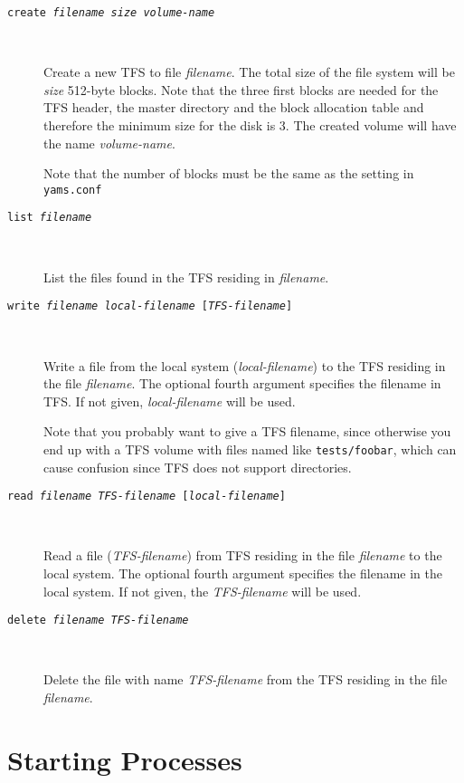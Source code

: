 \documentclass[twoside,a4paper]{report}
\newcommand{\metavar}[1]{\textrm{\textsl{#1}}}
\begin{document}
\begin{description}

\item[\texttt{create \metavar{filename} \metavar{size}
\metavar{volume-name}}]~

Create a new TFS to file \metavar{filename}. The total size of the
file system will be \metavar{size} 512-byte blocks. Note that the
three first blocks are needed for the TFS header, the master directory
and the block allocation table and therefore the minimum size for the
disk is 3. The created volume will have the name
\metavar{volume-name}.

Note that the number of blocks must be the same as the setting in
\texttt{yams.conf}

\item[\texttt{list \metavar{filename}}]~

List the files found in the TFS residing in \metavar{filename}.

\item[\texttt{write \metavar{filename} \metavar{local-filename}
[\metavar{TFS-filename}]}]~

Write a file from the local system (\metavar{local-filename}) to the
TFS residing in the file \metavar{filename}. The optional fourth
argument specifies the filename in TFS. If not given,
\metavar{local-filename} will be used.

Note that you probably want to give a TFS filename, since otherwise
you end up with a TFS volume with files named like
\texttt{tests/foobar}, which can cause confusion since TFS does not
support directories.

\item[\texttt{read \metavar{filename} \metavar{TFS-filename}
[\metavar{local-filename}]}]~

Read a file (\metavar{TFS-filename}) from TFS residing in the file
\metavar{filename} to the local system. The optional fourth argument
specifies the filename in the local system. If not given, the
\metavar{TFS-filename} will be used.

\item[\texttt{delete \metavar{filename} \metavar{TFS-filename}}]~

Delete the file with name \metavar{TFS-filename} from the TFS residing
in the file \metavar{filename}.

\end{description}


\section{Starting Processes}
\end{document}
